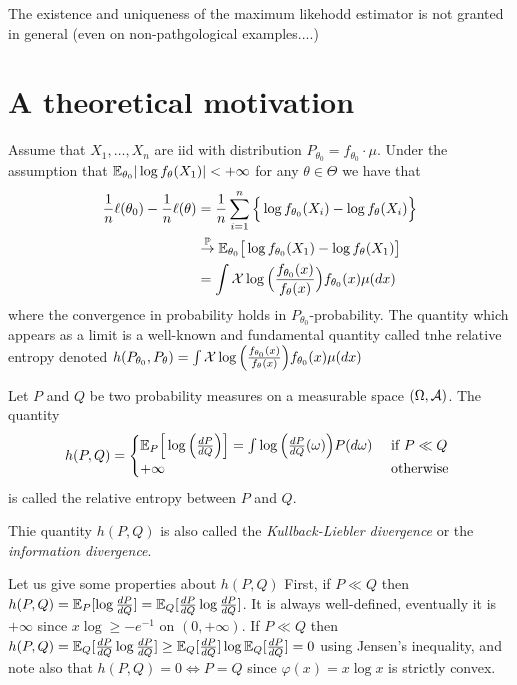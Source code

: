 The existence and uniqueness of the maximum likehodd estimator is not granted in general (even on non-pathgological examples....)

\section{A theoretical motivation} %
\label{sec:a_theoretical_motivation}

Assume that $X_1, \ldots, X_n$ are iid with distribution $P_{\theta_0} = f_{\theta_0} \cdot \mu$.
Under the assumption that $\mathbb E_{\theta_0} | \log f_{\theta}(X_1) | < +\infty$ for any $\theta \in \Theta$
we have that
\begin{align*}
	\frac 1n \ell(\theta_0) - \frac 1n \ell(\theta) &= \frac 1n \sum_{i=1}^n \Big\{ \log f_{\theta_0}(X_i) - \log f_{\theta}(X_i) \Big \} \\
	& \overset{\mathbb P}{\rightarrow} \mathbb E_{\theta_0} \big[ \log f_{\theta_0}(X_1) - \log f_{\theta}(X_1) \big] \\
	&= \int{\operatorname{{\mathcal X}}} \log \Big( \frac{f_{\theta_0}(x)}{f_{\theta}(x)} \Big) f_{\theta_0}(x) \mu(dx)
\end{align*}
where the convergence in probability holds in $P_{\theta_0}$-probability.
The quantity which appears as a limit is a well-known and fundamental quantity called tnhe relative entropy denoted $h(P_{\theta_0}, P_\theta) = \int{\operatorname{{\mathcal X}}} \log \Big( \frac{f_{\theta_0}(x)}{f_{\theta}(x)} \Big) f_{\theta_0}(x) \mu(dx)$

\begin{definition}
	Let $P$ and $Q$ be two probability measures on a measurable space $(\Omega, \operatorname{{\mathcal A}})$. 
	The quantity
	\begin{equation*}
		h(P, Q) = 
		\begin{cases}
		\mathbb E_P \Big[ \log \Big( \frac{dP}{dQ} \Big) \Big] = \int \log \Big( \frac{dP}{dQ}(\omega) \Big)  P(d \omega) &\text{ if } P \ll Q \\
		+ \infty & \text{ otherwise }
		\end{cases}
	\end{equation*}
	is called the relative entropy between $P$ and $Q$.
\end{definition}
Thie quantity $h(P, Q)$ is also called the \emph{Kullback-Liebler divergence} or the \emph{information divergence}.

Let us give some properties about $h(P, Q)$
First, if $P \ll Q$ then $h(P, Q) = \mathbb E_P[\log \frac{dP}{dQ}] = \mathbb E_Q[\frac{dP}{dQ} \log \frac{dP}{dQ}]$.
It is always well-defined, eventually it is $+\infty$ since $x \log \geq -e^{-1}$ on $(0, +\infty)$.
If $P \ll Q$ then $h(P, Q) = \mathbb E_Q[\frac{dP}{dQ} \log \frac{dP}{dQ}] \geq \mathbb E_Q[ \frac{dP}{dQ}] \log \mathbb E_Q[ \frac{dP}{dQ}] = 0$ using Jensen's inequality, and note also that $h(P, Q) = 0 \Leftrightarrow P = Q$ since $\varphi(x) = x \log x$ is strictly convex.

